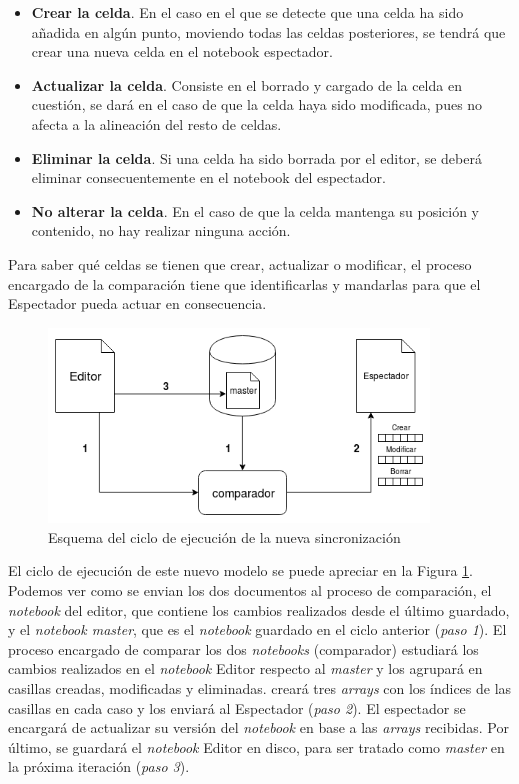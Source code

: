 \documentclass[11pt,spanish,listoffigures]{tfgetsinf}
\begin{document}
\begin{itemize}

\item \textbf{Crear la celda}. En el caso en el que se detecte que una celda ha sido añadida en algún punto, moviendo todas las celdas posteriores, se tendrá que crear una nueva celda en el notebook espectador.

\item \textbf{Actualizar la celda}. Consiste en el borrado y cargado de la celda en cuestión, se dará en el caso de que la celda haya sido modificada, pues no afecta a la alineación del resto de celdas.

\item \textbf{Eliminar la celda}. Si una celda ha sido borrada por el editor, se deberá eliminar consecuentemente en el notebook del espectador.

\item \textbf{No alterar la celda}. En el caso de que la celda mantenga su posición y contenido, no hay realizar ninguna acción.

\end{itemize}

Para saber qué celdas se tienen que crear, actualizar o modificar, el proceso encargado de la comparación tiene que identificarlas y mandarlas para que el Espectador pueda actuar en consecuencia. 

\begin{figure}[H]
	\centering
  	\includegraphics[width=0.9\textwidth]{nueva-sincro.png}
  	\caption{Esquema del ciclo de ejecución de la nueva sincronización}
  	\label{fig:new-sync}
\end{figure}

El ciclo de ejecución de este nuevo modelo se puede apreciar en la Figura \ref{fig:new-sync}. Podemos ver como se envian los dos documentos al proceso de comparación, el \textit{notebook} del editor, que contiene los cambios realizados desde el último guardado, y el \textit{notebook master}, que es el \textit{notebook} guardado en el ciclo anterior (\textit{paso 1}). El proceso encargado de comparar los dos \textit{notebooks} (comparador) estudiará los cambios realizados en el \textit{notebook} Editor respecto al \textit{master} y los agrupará en casillas creadas, modificadas y eliminadas. creará tres \textit{arrays} con los índices de las casillas en cada caso y los enviará al Espectador (\textit{paso 2}). El espectador se encargará de actualizar su versión del \textit{notebook} en base a las \textit{arrays} recibidas. Por último, se guardará el \textit{notebook} Editor en disco, para ser tratado como \textit{master} en la próxima iteración (\textit{paso 3}).
\end{document}
